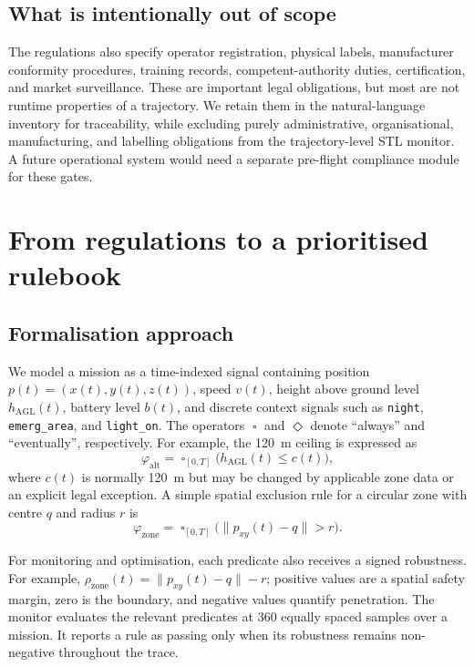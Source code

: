 \documentclass[11pt,a4paper]{article}
\newcommand{\always}{\mathop{\square}}
\newcommand{\eventually}{\mathop{\Diamond}}
\begin{document}
\subsection{What is intentionally out of scope}

The regulations also specify operator registration, physical labels, manufacturer conformity procedures, training records, competent-authority duties, certification, and market surveillance. These are important legal obligations, but most are not runtime properties of a trajectory. We retain them in the natural-language inventory for traceability, while excluding purely administrative, organisational, manufacturing, and labelling obligations from the trajectory-level STL monitor. A future operational system would need a separate pre-flight compliance module for these gates.

\section{From regulations to a prioritised rulebook}

\subsection{Formalisation approach}

We model a mission as a time-indexed signal containing position $p(t)=(x(t),y(t),z(t))$, speed $v(t)$, height above ground level $h_{\mathrm{AGL}}(t)$, battery level $b(t)$, and discrete context signals such as \texttt{night}, \texttt{emerg\_area}, and \texttt{light\_on}. The operators $\always$ and $\eventually$ denote ``always'' and ``eventually'', respectively. For example, the 120~m ceiling is expressed as
\begin{equation}
    \varphi_{\mathrm{alt}} = \always_{[0,T]}\bigl(h_{\mathrm{AGL}}(t) \leq c(t)\bigr),
    \label{eq:altitude}
\end{equation}
where $c(t)$ is normally 120~m but may be changed by applicable zone data or an explicit legal exception. A simple spatial exclusion rule for a circular zone with centre $q$ and radius $r$ is
\begin{equation}
    \varphi_{\mathrm{zone}} = \always_{[0,T]}\bigl(\lVert p_{xy}(t)-q\rVert > r\bigr).
    \label{eq:zone}
\end{equation}

For monitoring and optimisation, each predicate also receives a signed robustness. For example, $\rho_{\mathrm{zone}}(t)=\lVert p_{xy}(t)-q\rVert-r$; positive values are a spatial safety margin, zero is the boundary, and negative values quantify penetration. The monitor evaluates the relevant predicates at 360 equally spaced samples over a mission. It reports a rule as passing only when its robustness remains non-negative throughout the trace.
\end{document}
